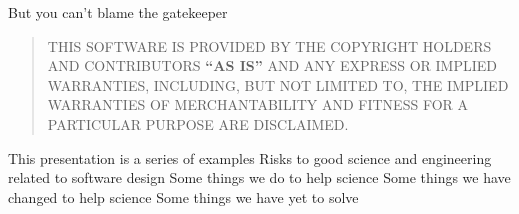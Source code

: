 \documentclass[aspectratio=169, 22pt]{beamer}
\begin{document}
\begin{centre}{But you can't blame the gatekeeper}
	\begin{quote}
	THIS SOFTWARE IS PROVIDED BY THE COPYRIGHT HOLDERS AND CONTRIBUTORS \textbf{``AS IS''}
	AND ANY EXPRESS OR IMPLIED WARRANTIES, INCLUDING, BUT NOT LIMITED TO, THE
	IMPLIED WARRANTIES OF MERCHANTABILITY AND FITNESS FOR A PARTICULAR PURPOSE
	ARE DISCLAIMED.
	\end{quote}
\end{centre}



\begin{points}{This presentation is a series of examples}
	\p Risks to good science and engineering related to software design
	\vfill
	\p Some things we do to help science
	\p Some things we have changed to help science
	\p Some things we have yet to solve
\end{points}
\end{document}
